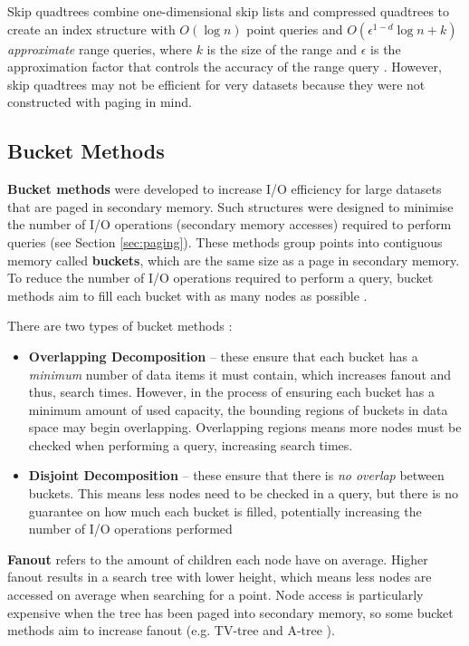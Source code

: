 Skip quadtrees combine one-dimensional skip lists \cite{skip-quadtree} and compressed quadtrees to create an index structure with $O(\log n)$ point queries and $O(\epsilon^{1 - d} \log n + k)$ \textit{approximate} range queries, where $k$ is the size of the range and $\epsilon$ is the approximation factor that controls the accuracy of the range query \cite{skip-quadtree}. However, skip quadtrees may not be efficient for very datasets because they were not constructed with paging in mind.

\subsection{Bucket Methods}
\label{sec:bucket-methods}

\textbf{Bucket methods} were developed to increase I/O efficiency for large datasets that are paged in secondary memory. Such structures were designed to minimise the number of I/O operations (secondary memory accesses) required to perform queries (see Section \ref{sec:paging}). These methods group points into contiguous memory called \textbf{buckets}, which are the same size as a page in secondary memory. To reduce the number of I/O operations required to perform a query, bucket methods aim to fill each bucket with as many nodes as possible \cite{md-structures-samet}.

There are two types of bucket methods \cite{md-structures-samet}:
\begin{itemize}
	\item \textbf{Overlapping Decomposition} -- these ensure that each bucket has a \textit{minimum} number of data items it must contain, which increases fanout and thus, search times. However, in the process of ensuring each bucket has a minimum amount of used capacity, the bounding regions of buckets in data space may begin overlapping. Overlapping regions means more nodes must be checked when performing a query, increasing search times.
	\item \textbf{Disjoint Decomposition} -- these ensure that there is \textit{no overlap} between buckets. This means less nodes need to be checked in a query, but there is no guarantee on how much each bucket is filled, potentially increasing the number of I/O operations performed
\end{itemize}

\textbf{Fanout} refers to the amount of children each node have on average. Higher fanout results in a search tree with lower height, which means less nodes are accessed on average when searching for a point. Node access is particularly expensive when the tree has been paged into secondary memory, so some bucket methods aim to increase fanout (e.g. TV-tree \cite{tv-tree} and A-tree \cite{a-tree}).

